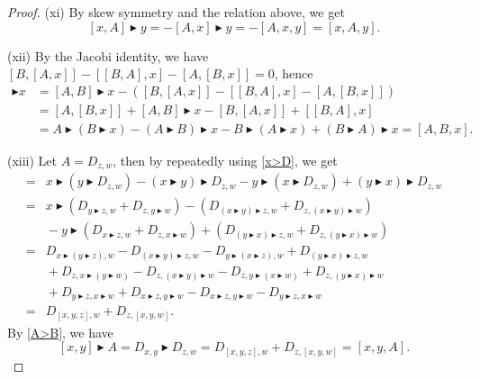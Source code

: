 \documentclass[pdftex]{sigma}
\numberwithin{equation}{section}
\begin{document}
\begin{proof}
(xi) By skew symmetry and the relation above, we get
 \[
 [x,A]\blacktriangleright y = - [A,x] \blacktriangleright y = -[A,x,y] = [x,A,y].
 \]

(xii) By the Jacobi identity, we have $[B,[A,x]] - [[B,A],x] - [A,[B,x]]=0$, hence
 \begin{align*}
 [A,B] \blacktriangleright x & = [A,B]\blacktriangleright x - ([B,[A,x]] - [[B,A],x] - [A,[B,x]] ) \\
 & = [A,[B,x]] + [A,B]\blacktriangleright x - [B,[A,x]] + [[B,A],x] \\
 & = A \blacktriangleright (B \blacktriangleright x ) - (A \blacktriangleright B) \blacktriangleright x - B \blacktriangleright (A \blacktriangleright x) + (B \blacktriangleright A) \blacktriangleright x
 = [A,B,x].
 \end{align*}

(xiii) Let $A = D_{z,w}$, then by repeatedly using \eqref{x>D}, we get
 \begin{align*}
 [x,y,A] ={}& x \blacktriangleright (y \blacktriangleright D_{z,w}) - (x \blacktriangleright y) \blacktriangleright D_{z,w} - y \blacktriangleright (x \blacktriangleright D_{z,w}) + (y \blacktriangleright x) \blacktriangleright D_{z,w} \\
 ={}& x\blacktriangleright (D_{y\blacktriangleright z,w} + D_{z,y \blacktriangleright w} ) - (D_{(x\blacktriangleright y) \blacktriangleright z,w} + D_{z, (x\blacktriangleright y) \blacktriangleright w} ) \\
 &{} - y \blacktriangleright (D_{x\blacktriangleright z,w} + D_{z,x \blacktriangleright w} ) + (D_{(y\blacktriangleright x) \blacktriangleright z,w} + D_{z, (y\blacktriangleright x) \blacktriangleright w} ) \\
 ={}& D_{x \blacktriangleright (y \blacktriangleright z),w} - D_{(x\blacktriangleright y) \blacktriangleright z,w} - D_{y \blacktriangleright (x\blacktriangleright z),w} + D_{(y\blacktriangleright x) \blacktriangleright z,w} \\
 &{}+ D_{z, x \blacktriangleright (y \blacktriangleright w)} - D_{z, (x\blacktriangleright y) \blacktriangleright w} - D_{z,y \blacktriangleright (x \blacktriangleright w)} + D_{z, (y\blacktriangleright x) \blacktriangleright w} \\
 &{}+ D_{y\blacktriangleright z, x\blacktriangleright w} + D_{x \blacktriangleright z, y \blacktriangleright w} - D_{x \blacktriangleright z, y \blacktriangleright w} - D_{y \blacktriangleright z, x \blacktriangleright w} \\
 ={}& D_{[x,y,z],w} + D_{z,[x,y,w]}.
 \end{align*}
 By \eqref{A>B}, we have
 \[
 [x,y] \blacktriangleright A = D_{x,y} \blacktriangleright D_{z,w} = D_{[x,y,z],w} + D_{z,[x,y,w]} = [x,y,A].
 \]


\end{proof}
\end{document}
